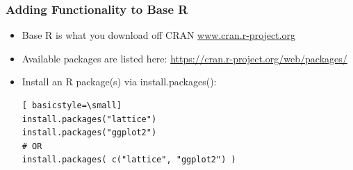 \begin{frame}[fragile]
	\frametitle{Adding Functionality to Base R}

	\begin{itemize}
		\item Base R is what you download off CRAN \url{www.cran.r-project.org} 
		\item Available packages are listed here: \url{https://cran.r-project.org/web/packages/}
		\item Install an R package(s) via \ttfamily install.packages(): \normalfont 
   	\begin{lstlisting}[ basicstyle=\small]
install.packages("lattice")
install.packages("ggplot2")
# OR
install.packages( c("lattice", "ggplot2") )

	\end{lstlisting}
	\end{itemize} 	
\end{frame}



